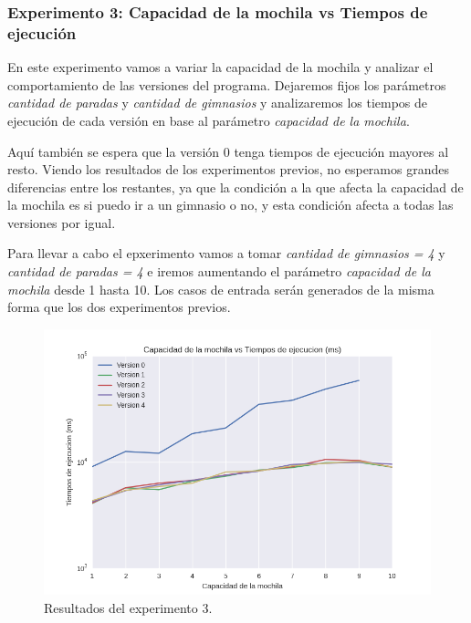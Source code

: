 \subsubsection{Experimento 3: Capacidad de la mochila vs Tiempos de ejecución}

\par En este experimento vamos a variar la capacidad de la mochila y analizar el comportamiento de las versiones del programa. Dejaremos fijos los parámetros \textit{cantidad de paradas} y \textit{cantidad de gimnasios} y analizaremos los tiempos de ejecución de cada versión en base al parámetro \textit{capacidad de la mochila}.

\par Aquí también se espera que la versión 0 tenga tiempos de ejecución mayores al resto. Viendo los resultados de los experimentos previos, no esperamos grandes diferencias entre los restantes, ya que la condición a la que afecta la capacidad de la mochila es si puedo ir a un gimnasio o no, y esta condición afecta a todas las versiones por igual.

\par Para llevar a cabo el epxerimento vamos a tomar \textit{cantidad de gimnasios = 4} y \textit{cantidad de paradas = 4} e iremos aumentando el parámetro \textit{capacidad de la mochila} desde 1 hasta 10. Los casos de entrada serán generados de la misma forma que los dos experimentos previos.

\begin{figure}[H]
	\begin{center}
		\includegraphics[width=\textwidth]{img/ejercicio1/exp3_1.png}
		\caption{Resultados del experimento 3.}
		\label{fig: ej1_exp3_1}
	\end{center}
\end{figure}

